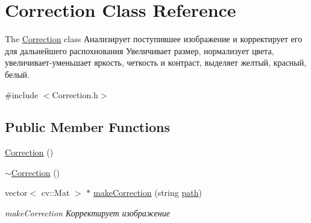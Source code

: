 \hypertarget{class_correction}{\section{Correction Class Reference}
\label{class_correction}
}


The \hyperlink{class_correction}{Correction} class Анализирует поступившее изображение и корректирует его для дальнейшего распохнования Увеличивает размер, нормализует цвета, увеличивает-\/уменьшает яркость, четкость и контраст, выделяет желтый, красный, белый.  




{\ttfamily \#include $<$Correction.\+h$>$}

\subsection*{Public Member Functions}
\begin{DoxyCompactItemize}
\item 
\hyperlink{class_correction_ab2b5a19788aa1940ca828c450a5f5d4f}{Correction} ()
\item 
\hyperlink{class_correction_ad13cd5cc763e4cfced5595b1bb69e8dc}{$\sim$\+Correction} ()
\item 
vector$<$ cv\+::\+Mat $>$ $\ast$ \hyperlink{class_correction_a2a43e98d77beaf6fee39a6fe1bbfbb26}{make\+Correction} (string \hyperlink{class_correction_a6e1ccea5c33ea89d717d9227d17f625c}{path})
\begin{DoxyCompactList}\small\item\em make\+Correction Корректирует изображение \end{DoxyCompactList}\end{DoxyCompactItemize}

